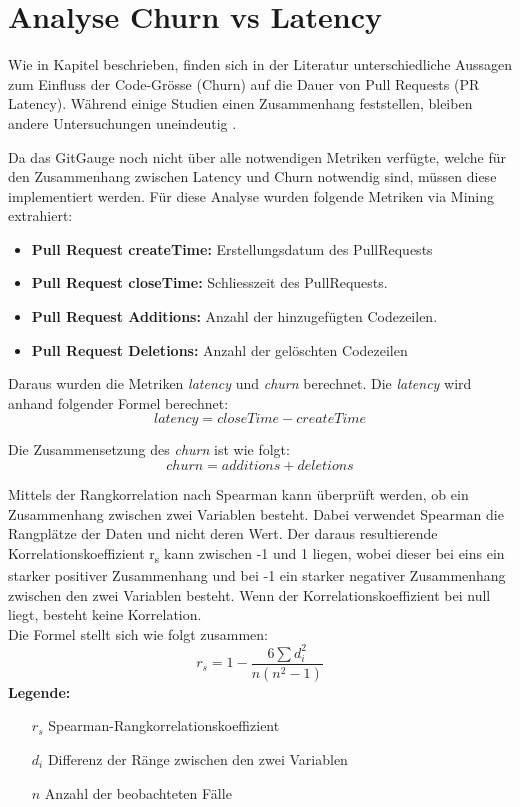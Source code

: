 \section{Analyse Churn vs Latency}
\label{sec:Metriken}
Wie in Kapitel  beschrieben, finden sich in der Literatur unterschiedliche Aussagen zum Einfluss der Code-Grösse (Churn) auf die Dauer von Pull Requests (PR Latency). Während einige Studien einen Zusammenhang feststellen, bleiben andere Untersuchungen uneindeutig \parencite{hasan_understanding_2023}\parencite{kudrjavets_small_2022}.

Da das GitGauge noch nicht über alle notwendigen Metriken verfügte, welche für den Zusammenhang zwischen Latency und Churn notwendig sind, müssen diese implementiert werden. Für diese Analyse wurden folgende Metriken via Mining extrahiert:
\begin{itemize}
    \item \textbf{Pull Request createTime:} Erstellungsdatum des PullRequests
    \item \textbf{Pull Request closeTime:} Schliesszeit des PullRequests.
    \item \textbf{Pull Request Additions:} Anzahl der hinzugefügten Codezeilen.
    \item \textbf{Pull Request Deletions:} Anzahl der gelöschten Codezeilen
\end{itemize}

Daraus wurden die Metriken \textit{latency} und \textit{churn} berechnet. Die \textit{latency} wird anhand folgender Formel berechnet:
\begin{equation}
latency = closeTime - createTime
\end{equation}

Die Zusammensetzung des \textit{churn} ist wie folgt:
\begin{equation}
churn = additions + deletions
\end{equation}

Mittels der Rangkorrelation nach Spearman kann überprüft werden, ob ein Zusammenhang zwischen zwei Variablen besteht. Dabei verwendet Spearman die Rangplätze der Daten und nicht deren Wert. Der daraus resultierende Korrelationskoeffizient r\textsubscript{s} kann zwischen -1 und 1 liegen, wobei dieser bei eins ein starker positiver Zusammenhang und bei -1 ein starker negativer Zusammenhang zwischen den zwei Variablen besteht. Wenn der Korrelationskoeffizient bei null liegt, besteht keine Korrelation. \parencite{noauthor_t-test_nodate}  \\
Die Formel \parencite{noauthor_t-test_nodate} stellt sich wie folgt zusammen: 
\begin{equation}
r_s = 1 - \frac{6 \sum d_i^2}{n(n^2 - 1)}
\end{equation}
\label{eqn:spearman}
\noindent\textbf{Legende:}
\begin{itemize}
  \item [$r_s$] Spearman-Rangkorrelationskoeffizient
  \item[$d_i$] Differenz der Ränge zwischen den zwei Variablen 
  \item[$n$] Anzahl der beobachteten Fälle
\end{itemize}


